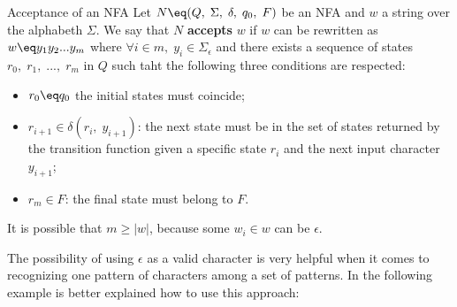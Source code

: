 \begin{definition}{Acceptance of an NFA}
    Let $N \eq (Q, \; \Sigma, \; \delta, \; q_0, \; F)$ be an NFA and $w$ a string over the alphabeth $\Sigma$. We say that $N$ \textbf{accepts} $w$ if $w$ can be rewritten as $w \eq y_1 y_2 ... y_m$ where $\forall i \in m, \; y_i \in \Sigma_{\epsilon}$ and there exists a sequence of states $r_0, \; r_1, \; ..., \; r_m$ in $Q$ such taht the following three conditions are respected:
    \begin{itemize}
        \item $r_0 \eq q_0$ the initial states must coincide;
        \item $r_{i + 1} \in \delta(r_i, \; y_{i + 1})$: the next state must be in the set of states returned by the transition function given a specific state $r_i$ and the next input character $y_{i + 1}$;
        \item $r_m \in F$: the final state must belong to $F$.
    \end{itemize}

    It is possible that $m \geq |w|$, because some $w_i \in w$ can be $\epsilon$.
\end{definition}

The possibility of using $\epsilon$ as a valid character is very helpful when it comes to recognizing one pattern of characters among a set of patterns. In the following example is better explained how to use this approach:

